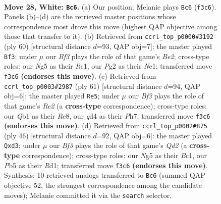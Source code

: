 \documentclass[11pt]{article}
\begin{document}
\clearpage

\begin{figure}[p]\centering
\begin{subfigure}{0.46\textwidth}\centering
\resizebox{\linewidth}{!}{%
\newchessgame
\chessboard[
  setfen={rnr5/4k3/1p2p3/pP3pN1/3q1n1p/5B1P/P1K3P1/RQ5R w - - 4 28},
  showmover=false,
  pgfstyle=straightmove, color=movearrow, markmove={f3-c6}
]}
\caption{}
\end{subfigure}\hfill
\begin{subfigure}{0.46\textwidth}\centering
\resizebox{\linewidth}{!}{%
\newchessgame
\chessboard[
  setfen={r7/6pk/p6p/1p2pp2/4n3/1P2q2P/P1Q1B1PK/2R1N3 w - - 0 31},
  showmover=false,
  pgfstyle=straightmove, color=movearrow, markmove={e2-f3}
]}
\caption{}
\end{subfigure}
\\[4pt]
\begin{subfigure}{0.46\textwidth}\centering
\resizebox{\linewidth}{!}{%
\newchessgame
\chessboard[
  setfen={4r2k/4r2p/1Q1n1qb1/p2P4/P1pN1p2/5P2/3R2PP/2R1NK2 b - - 4 31},
  showmover=false,
  pgfstyle=straightmove, color=movearrow, markmove={e7-e5}
]}
\caption{}
\end{subfigure}\hfill
\begin{subfigure}{0.46\textwidth}\centering
\resizebox{\linewidth}{!}{%
\newchessgame
\chessboard[
  setfen={3r2k1/1p3pp1/1q1n3p/3P3N/3n4/3b1P1P/1P1Q2PK/2BR4 w - - 0 24},
  showmover=false,
  pgfstyle=straightmove, color=movearrow, markmove={d2-d3}
]}
\caption{}
\end{subfigure}
\caption{\textbf{Move 28, White: \texttt{Bc6}.} (a) Our position; Melanie plays \texttt{Bc6} (\texttt{f3c6}). Panels (b)--(d) are the retrieved master positions whose correspondence most drove this move (highest QAP objective among those that transfer to it). (b) Retrieved from \texttt{ccrl\_top\_p0000\#3192} (ply 60) [structural distance $d$=93, QAP obj=7]: the master played \texttt{Bf3}; under $\mu$ our \emph{Bf3} plays the role of that game's \emph{Be2}; cross-type roles: our \emph{N}g5 as their \emph{R}c1, our \emph{P}g2 as their \emph{N}e1; transferred move \texttt{f3c6} \textbf{(endorses this move)}. (c) Retrieved from \texttt{ccrl\_top\_p0003\#2987} (ply 61) [structural distance $d$=94, QAP obj=6]: the master played \texttt{Re5}; under $\mu$ our \emph{Bf3} plays the role of that game's \emph{Re2} (a \textbf{cross-type} correspondence); cross-type roles: our \emph{Q}b1 as their \emph{R}e8, our \emph{q}d4 as their \emph{P}h7; transferred move \texttt{f3c6} \textbf{(endorses this move)}. (d) Retrieved from \texttt{ccrl\_top\_p0002\#875} (ply 46) [structural distance $d$=92, QAP obj=6]: the master played \texttt{Qxd3}; under $\mu$ our \emph{Bf3} plays the role of that game's \emph{Qd2} (a \textbf{cross-type} correspondence); cross-type roles: our \emph{N}g5 as their \emph{B}c1, our \emph{P}b5 as their \emph{R}d1; transferred move \texttt{f3c6} \textbf{(endorses this move)}. Synthesis: 10 retrieved analogs transferred to \texttt{Bc6} (summed QAP objective 52, the strongest correspondence among the candidate moves); Melanie committed it via the \texttt{search} selector.}
\label{fig:thought-m54}
\end{figure}
\end{document}
